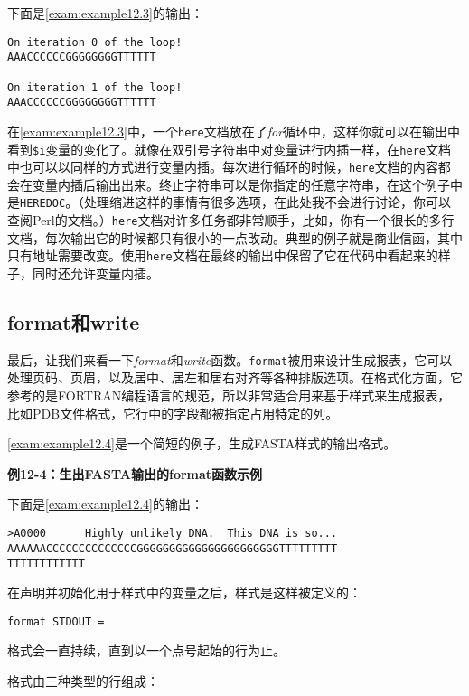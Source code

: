 下面是\autoref{exam:example12.3}的输出：

\begin{lstlisting}
On iteration 0 of the loop!
AAACCCCCCGGGGGGGGTTTTTT

On iteration 1 of the loop!
AAACCCCCCGGGGGGGGTTTTTT
\end{lstlisting}

在\autoref{exam:example12.3}中，一个\verb|here|文档放在了\textit{for}循环中，这样你就可以在输出中看到\verb|$i|变量的变化了。就像在双引号字符串中对变量进行内插一样，在\verb|here|文档中也可以以同样的方式进行变量内插。每次进行循环的时候，\verb|here|文档的内容都会在变量内插后输出出来。终止字符串可以是你指定的任意字符串，在这个例子中是\verb|HEREDOC|。（处理缩进这样的事情有很多选项，在此处我不会进行讨论，你可以查阅Perl的文档。）\verb|here|文档对许多任务都非常顺手，比如，你有一个很长的多行文档，每次输出它的时候都只有很小的一点改动。典型的例子就是商业信函，其中只有地址需要改变。使用\verb|here|文档在最终的输出中保留了它在代码中看起来的样子，同时还允许变量内插。

\subsection{format和write}
最后，让我们来看一下\textit{format}和\textit{write}函数。\verb|format|被用来设计生成报表，它可以处理页码、页眉，以及居中、居左和居右对齐等各种排版选项。在格式化方面，它参考的是FORTRAN编程语言的规范，所以非常适合用来基于样式来生成报表，比如PDB文件格式，它行中的字段都被指定占用特定的列。

\autoref{exam:example12.4}是一个简短的例子，生成FASTA样式的输出格式。

\textbf{例12-4：生出FASTA输出的format函数示例}


下面是\autoref{exam:example12.4}的输出：

\begin{lstlisting}
>A0000      Highly unlikely DNA.  This DNA is so...
AAAAAACCCCCCCCCCCCCCGGGGGGGGGGGGGGGGGGGGGGTTTTTTTTT
TTTTTTTTTTTT
\end{lstlisting}

在声明并初始化用于样式中的变量之后，样式是这样被定义的：

\begin{lstlisting}
format STDOUT =
\end{lstlisting}

格式会一直持续，直到以一个点号起始的行为止。

格式由三种类型的行组成：

